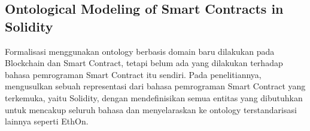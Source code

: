 \subsection{Ontological Modeling of Smart Contracts in Solidity}
\label{subsec:solidity-ontology}

Formalisasi menggunakan ontology berbasis domain baru dilakukan pada Blockchain dan Smart Contract, tetapi belum ada yang dilakukan terhadap bahasa pemrograman Smart Contract itu sendiri. Pada penelitiannya, \cite{cano2021toward} mengusulkan sebuah representasi dari bahasa pemrograman Smart Contract yang terkemuka, yaitu Solidity, dengan mendefinisikan semua entitas yang dibutuhkan untuk mencakup seluruh bahasa dan menyelaraskan ke ontology terstandarisasi lainnya seperti EthOn.


